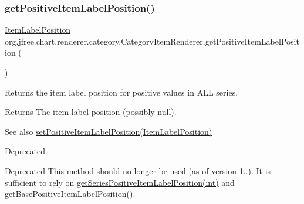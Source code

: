 \subsubsection{\texorpdfstring{get\+Positive\+Item\+Label\+Position()}{getPositiveItemLabelPosition()}\hspace{0.1cm}{\footnotesize\ttfamily [2/2]}}
{\footnotesize\ttfamily \mbox{\hyperlink{classorg_1_1jfree_1_1chart_1_1labels_1_1_item_label_position}{Item\+Label\+Position}} org.\+jfree.\+chart.\+renderer.\+category.\+Category\+Item\+Renderer.\+get\+Positive\+Item\+Label\+Position (\begin{DoxyParamCaption}{ }\end{DoxyParamCaption})}

Returns the item label position for positive values in A\+LL series.

\begin{DoxyReturn}{Returns}
The item label position (possibly {\ttfamily null}).
\end{DoxyReturn}
\begin{DoxySeeAlso}{See also}
\mbox{\hyperlink{interfaceorg_1_1jfree_1_1chart_1_1renderer_1_1category_1_1_category_item_renderer_a5c8f5ce5838f1665ccea46f50e507c0d}{set\+Positive\+Item\+Label\+Position(\+Item\+Label\+Position)}}
\end{DoxySeeAlso}
\begin{DoxyRefDesc}{Deprecated}
\item[\mbox{\hyperlink{deprecated__deprecated000174}{Deprecated}}]This method should no longer be used (as of version 1..). It is sufficient to rely on \mbox{\hyperlink{interfaceorg_1_1jfree_1_1chart_1_1renderer_1_1category_1_1_category_item_renderer_aa8bb0c1b20139707cb336afc9bed9b78}{get\+Series\+Positive\+Item\+Label\+Position(int)}} and \mbox{\hyperlink{interfaceorg_1_1jfree_1_1chart_1_1renderer_1_1category_1_1_category_item_renderer_aa447d7a69c2ceeed6c734eae9cb995f3}{get\+Base\+Positive\+Item\+Label\+Position()}}. \end{DoxyRefDesc}
\mbox{\label{interfaceorg_1_1jfree_1_1chart_1_1renderer_1_1category_1_1_category_item_renderer_a7e2dd43c2b47d951c69a365266cdc281}} 
